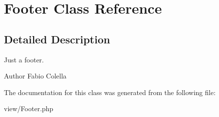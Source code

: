 \hypertarget{classFooter}{\section{Footer Class Reference}
\label{classFooter}
}


\subsection{Detailed Description}
Just a footer.

\begin{DoxyAuthor}{Author}
Fabio Colella 
\end{DoxyAuthor}


The documentation for this class was generated from the following file\+:\begin{DoxyCompactItemize}
\item 
view/Footer.\+php\end{DoxyCompactItemize}
